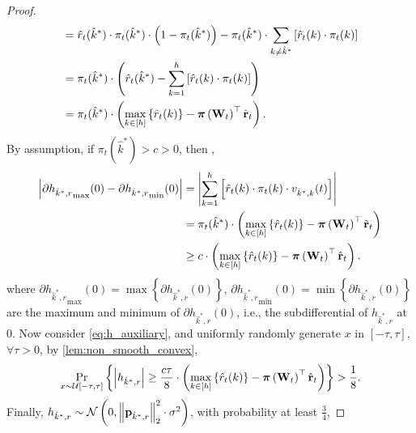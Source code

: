 \begin{proof}
\begin{equation*}
\begin{split}
	&= \hat{r}_{t}(\hat{k}^*) \cdot \pi_{t}(\hat{k}^*) \cdot \left( 1 - \pi_{t}(\hat{k}^*) \right) - \pi_{t}(\hat{k}^*) \cdot \sum\limits_{k\not=\hat{k}^*}{ \left[ \hat{r}_{t}(k) \cdot \pi_{t}(k) \right] } \\
	&= \pi_{t}(\hat{k}^*) \cdot \left( \hat{r}_{t}(\hat{k}^*) - \sum\limits_{k=1}^{h}{ \left[ \hat{r}_{t}(k) \cdot \pi_{t}(k) \right] } \right) \\
	&= \pi_{t}(\hat{k}^*) \cdot \left( \max\limits_{k \in \left[h\right]}\left\{ \hat{r}_t(k) \right\} - {\boldsymbol{\pi}}\left( {\mathbf{W}}_t \right)^\top \hat{{\mathbf{r}}}_t  \right).
\end{split}
\end{equation*}
By assumption, if $\pi_{t}(\hat{k}^*) > c > 0$, then ,
\begin{equation*}
\begin{split}
	\left| \partial{h_{\hat{k}^*,r}}_{\max}{(0)} - \partial{h_{\hat{k}^*,r}}_{\min}{(0)} \right| &= \left| \sum\limits_{k=1}^{h}{ \left[  \hat{r}_{t}(k) \cdot \pi_{t}(k) \cdot v_{\hat{k}^*,k}(t) \right] } \right| \\
	&= \pi_{t}(\hat{k}^*) \cdot \left( \max\limits_{k \in \left[h\right]}\left\{ \hat{r}_t(k) \right\} - {\boldsymbol{\pi}}\left( {\mathbf{W}}_t \right)^\top \hat{{\mathbf{r}}}_t  \right) \\
	&\ge c \cdot \left( \max\limits_{k \in \left[h\right]}\left\{ \hat{r}_t(k) \right\} - {\boldsymbol{\pi}}\left( {\mathbf{W}}_t \right)^\top \hat{{\mathbf{r}}}_t  \right).
\end{split}
\end{equation*}
where $\partial{h_{\hat{k}^*,r}}_{\max}{(0)} = \max\left\{ \partial{h_{\hat{k}^*,r}}{(0)} \right\}$, $\partial{h_{\hat{k}^*,r}}_{\min}{(0)} = \min\left\{ \partial{h_{\hat{k}^*,r}}{(0)} \right\}$ are the maximum and minimum of $\partial{h_{\hat{k}^*,r}}{(0)}$, i.e., the subdifferential of $h_{\hat{k}^*,r}$ at $0$. Now consider \cref{eq:h_auxiliary}, and uniformly randomly generate $x$ in $\left[ -\tau, \tau \right]$, $\forall \tau > 0$, by \cref{lem:non_smooth_convex},
\begin{equation}
\label{eq:h_regret_lower_bound}
\begin{split}
	\operatorname*{Pr}\limits_{x \sim  {\mathcal{U}}[-\tau, \tau]}\left\{ \left|  h_{\hat{k}^*,r} \right| \ge \frac{c\tau}{8} \cdot \left( \max\limits_{k \in \left[h\right]}\left\{ \hat{r}_t(k) \right\} - {\boldsymbol{\pi}}\left( {\mathbf{W}}_t \right)^\top \hat{{\mathbf{r}}}_t  \right) \right\} > \frac{1}{8}.
\end{split}
\end{equation}
Finally, $h_{\hat{k}^*,r} \sim {\mathcal{N}}\left( 0, \left\| {\mathbf{p}}_{\hat{k}^*, r} \right\|_2^2 \cdot \sigma^2 \right)$, with probability at least $\frac{3}{4}$,

\end{proof}
